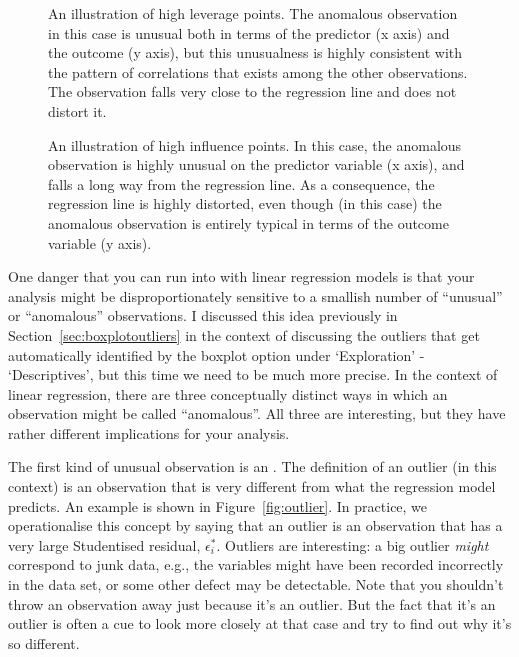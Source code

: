 \begin{figure}[!htb]
\begin{center}
\caption{An illustration of high leverage points. The anomalous observation in this case is unusual both in terms of the predictor (x axis) and the outcome (y axis), but this unusualness is highly consistent with the pattern of correlations that exists among the other observations. The observation falls very close to the regression line and does not distort it.}
\HR
\label{fig:leverage}
\end{center}
\end{figure}

\begin{figure}[!b]
\begin{center}
\caption{An illustration of high influence points. In this case, the anomalous observation is highly unusual on the predictor variable (x axis), and falls a long way from the regression line. As a consequence, the regression line is highly distorted, even though (in this case) the anomalous observation is entirely typical in terms of the outcome variable (y axis).}
\HR
\label{fig:influence}
\end{center}
\end{figure}

One danger that you can run into with linear regression models is that your analysis might be disproportionately sensitive to a smallish number of ``unusual'' or ``anomalous'' observations. I discussed this idea previously in Section~\ref{sec:boxplotoutliers} in the context of discussing the outliers that get automatically identified by the boxplot option under `Exploration' - `Descriptives', but this time we need to be much more precise. In the context of linear regression, there are three conceptually distinct ways in which an observation might be called ``anomalous''. All three are interesting, but they have rather different implications for your analysis.

The first kind of unusual observation is an . The definition of an outlier (in this context) is an observation that is very different from what the regression model predicts. An example is shown in Figure~\ref{fig:outlier}. In practice, we operationalise this concept by saying that an outlier is an observation that has a very large Studentised residual, $\epsilon_i^*$. Outliers are interesting: a big outlier {\it might} correspond to junk data, e.g., the variables might have been recorded incorrectly in the data set, or some other defect may be detectable. Note that you shouldn't throw an observation away just because it's an outlier. But the fact that it's an outlier is often a cue to look more closely at that case and try to find out why it's so different.

